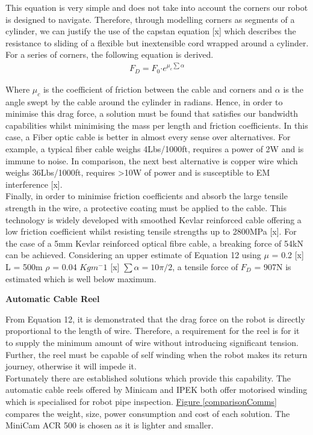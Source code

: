 \documentclass[11pt]{article}		%
\begin{document}
        This equation is very simple and does not take into account the corners our robot is designed to navigate. 
        Therefore, through modelling corners as segments of a cylinder, we can justify the use of the capstan equation [x] which describes the resistance to sliding of a flexible but inextensible cord wrapped around a cylinder. 
        For a series of corners, the following equation is derived.
        \begin{align}
                F_D = F_0 \boldsymbol{\cdot} {e}^{\mu_c \sum \alpha}
        \end{align}

		Where $\mu_c$ is the coefficient of friction between the cable and corners and $\alpha$ is the angle swept by the cable around the cylinder in radians. 
	    Hence, in order to minimise this drag force, a solution must be found that satisfies our bandwidth capabilities whilst minimising the mass per length and friction coefficients.  
	    In this case, a Fiber optic cable is better in almost every sense over alternatives. 
	    For example, a typical fiber cable weighs 4Lbs/1000ft, requires a power of 2W and is immune to noise. 
	    In comparison, the next best alternative is copper wire which weighs 36Lbs/1000ft, requires >10W of power and is susceptible to EM interference [x].
	    \\
	    Finally, in order to minimise friction coefficients and absorb the large tensile strength in the wire, a protective coating must be applied to the cable. 
	    This technology is widely developed with smoothed Kevlar reinforced cable offering a low friction coefficient whilst resisting tensile strengths up to 2800MPa [x]. For the case of a 5mm Kevlar reinforced optical fibre cable, a breaking force of 54kN can be achieved. 
	    Considering an upper estimate of Equation 12 using $\mu$ = 0.2 [x] L = 500m $\rho$ = 0.04 $Kgm^-1$ [x] $\sum \alpha = 10\pi/2$, a tensile force of $F_D$ = 907N is estimated which is well below maximum. 
	    
	    \textbf{Automatic Cable Reel}

        From Equation 12, it is demonstrated that the drag force on the robot is directly proportional to the length of wire. 
        Therefore, a requirement for the reel is for it to supply the minimum amount of wire without introducing significant tension. 
        Further, the reel must be capable of self winding when the robot makes its return journey, otherwise it will impede it.
        \\ 
        \hspace*{3ex}Fortunately there are established solutions which provide this capability. 
        The automatic cable reels offered by Minicam and IPEK both offer motorised winding which is specialised for robot pipe inspection. 
        \hyperref[comparisonComms]{Figure \ref*{comparisonComms}} compares the weight, size, power consumption and cost of each solution. 
        The MiniCam ACR 500 is chosen as it is lighter and smaller. 
\end{document}
